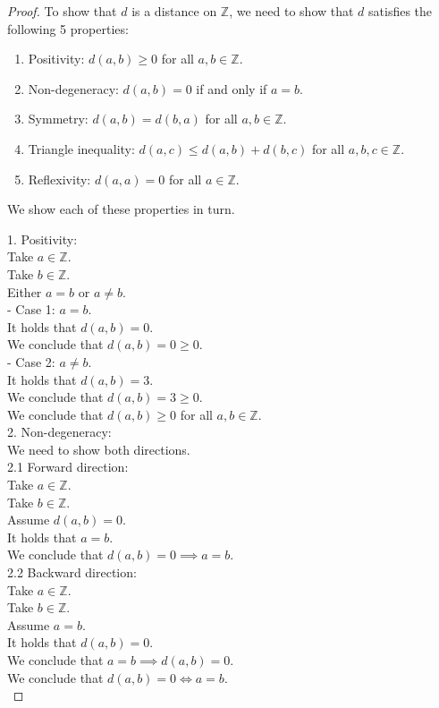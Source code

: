 \documentclass{article}
\newcommand\tab[1][1cm]{\hspace*{#1}}
\theoremstyle{mytheoremstyle}
\theoremstyle{mytheoremstyle}
\theoremstyle{myproblemstyle}
\begin{document}
    \begin{proof}
        To show that $d$ is a distance on $\mathbb{Z}$, we need to show that $d$ satisfies the following 5 properties:
        \begin{enumerate}
            \item Positivity: $d(a,b) \geq 0$ for all $a,b \in \mathbb{Z}$.
            \item Non-degeneracy: $d(a,b) = 0$ if and only if $a = b$.
            \item Symmetry: $d(a,b) = d(b,a)$ for all $a,b \in \mathbb{Z}$.
            \item Triangle inequality: $d(a,c) \leq d(a,b) + d(b,c)$ for all $a,b,c \in \mathbb{Z}$.
            \item Reflexivity: $d(a,a) = 0$ for all $a \in \mathbb{Z}$.
        \end{enumerate}

        We show each of these properties in turn.

        1. Positivity: \\
        Take $a \in \mathbb{Z}$. \\
        Take $b \in \mathbb{Z}$. \\
        Either $a = b$ or $a \ne b$. \\
        - Case 1: $a = b$. \\
        \tab It holds that $d(a,b) = 0$. \\
        \tab We conclude that $d(a,b) = 0 \geq 0$. \\
        - Case 2: $a \ne b$. \\
        \tab It holds that $d(a,b) = 3$. \\
        \tab We conclude that $d(a,b) = 3 \geq 0$. \\
        We conclude that $d(a,b) \geq 0$ for all $a,b \in \mathbb{Z}$. \\

        2. Non-degeneracy: \\
        We need to show both directions. \\
        2.1 Forward direction: \\
        Take $a \in \mathbb{Z}$. \\
        Take $b \in \mathbb{Z}$. \\
        Assume $d(a,b) = 0$. \\
        It holds that $a = b$. \\
        We conclude that $d(a,b) = 0 \implies a = b$. \\
        2.2 Backward direction: \\
        Take $a \in \mathbb{Z}$. \\
        Take $b \in \mathbb{Z}$. \\
        Assume $a = b$. \\
        It holds that $d(a,b) = 0$. \\
        We conclude that $a = b \implies d(a,b) = 0$. \\
        We conclude that $d(a,b) = 0 \iff a = b$. \\


\end{proof}
\end{document}
